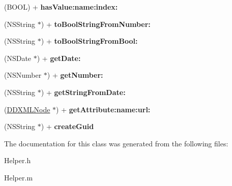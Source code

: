 \begin{DoxyCompactItemize}
\item 
\hypertarget{interface_helper_a94288ef3e3d44674e719688c289b4409}{}(B\+O\+O\+L) + {\bfseries has\+Value\+:name\+:index\+:}\label{interface_helper_a94288ef3e3d44674e719688c289b4409}

\item 
\hypertarget{interface_helper_ac0a806667ffac32ede49ac32f20ad399}{}(N\+S\+String $\ast$) + {\bfseries to\+Bool\+String\+From\+Number\+:}\label{interface_helper_ac0a806667ffac32ede49ac32f20ad399}

\item 
\hypertarget{interface_helper_a14f9d317fb365c5ad6ab94b742432b7d}{}(N\+S\+String $\ast$) + {\bfseries to\+Bool\+String\+From\+Bool\+:}\label{interface_helper_a14f9d317fb365c5ad6ab94b742432b7d}

\item 
\hypertarget{interface_helper_ac04195e822a32996536a5468df9abf5b}{}(N\+S\+Date $\ast$) + {\bfseries get\+Date\+:}\label{interface_helper_ac04195e822a32996536a5468df9abf5b}

\item 
\hypertarget{interface_helper_a36da8ca777ea1bad8a1d63b1657a49e6}{}(N\+S\+Number $\ast$) + {\bfseries get\+Number\+:}\label{interface_helper_a36da8ca777ea1bad8a1d63b1657a49e6}

\item 
\hypertarget{interface_helper_a214d4d443666b30a2d8b0a5a262bb089}{}(N\+S\+String $\ast$) + {\bfseries get\+String\+From\+Date\+:}\label{interface_helper_a214d4d443666b30a2d8b0a5a262bb089}

\item 
\hypertarget{interface_helper_a0b8e7bc8f9f22f6c60621246fe5dc7ab}{}(\hyperlink{interface_d_d_x_m_l_node}{D\+D\+X\+M\+L\+Node} $\ast$) + {\bfseries get\+Attribute\+:name\+:url\+:}\label{interface_helper_a0b8e7bc8f9f22f6c60621246fe5dc7ab}

\item 
\hypertarget{interface_helper_ada4fdc16f58c90fd3545209436dbcace}{}(N\+S\+String $\ast$) + {\bfseries create\+Guid}\label{interface_helper_ada4fdc16f58c90fd3545209436dbcace}

\end{DoxyCompactItemize}


The documentation for this class was generated from the following files\+:\begin{DoxyCompactItemize}
\item 
Helper.\+h\item 
Helper.\+m\end{DoxyCompactItemize}
